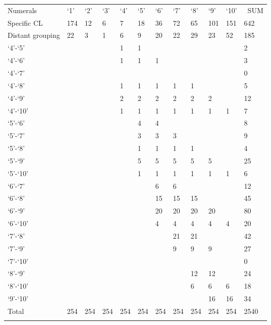 \begin{table}
  
\begin{tabularx}{\textwidth}{lXXXXXXXXXXX}
\lsptoprule
{Numerals} & {‘1’} & {‘2’} & {‘3’} & {‘4’} & {‘5’} & {‘6’} & {‘7’} & {‘8’} & {‘9’} & {‘10’} & {~SUM}\\
Specific CL & 174 & 12 & 6 & 7 & 18 & 36 & 72 & 65 & 101 & 151 & 642\\
Distant grouping & 22 & 3 & 1 & 6 & 9 & 20 & 22 & 29 & 23 & 52 & 185\\
\midrule
‘4’-‘5’ & & ~ & & 1 & 1 & & ~ & & ~ & & 2\\
‘4’-‘6’ & & ~ & & 1 & 1 & 1 & & ~ & & ~ & 3\\
‘4’-‘7’ & & ~ & & ~ & & ~ & & ~ & & ~ & 0\\
‘4’-‘8’ & & ~ & & 1 & 1 & 1 & 1 & 1 & & ~ & 5\\
‘4’-‘9’ & & ~ & & 2 & 2 & 2 & 2 & 2 & 2 & & 12\\
‘4’-‘10’ & & ~ & & 1 & 1 & 1 & 1 & 1 & 1 & 1 & 7\\
‘5’-‘6’ & & ~ & & ~ & 4 & 4 & & ~ & & ~ & 8\\
‘5’-‘7’ & & ~ & & ~ & 3 & 3 & 3 & & ~ & & 9\\
‘5’-‘8’ & & ~ & & ~ & 1 & 1 & 1 & 1 & & ~ & 4\\
‘5’-‘9’ & & ~ & & ~ & 5 & 5 & 5 & 5 & 5 & & 25\\
‘5’-‘10’ & & ~ & & ~ & 1 & 1 & 1 & 1 & 1 & 1 & 6\\
‘6’-‘7’ & & ~ & & ~ & & 6 & 6 & & ~ & & 12\\
‘6’-‘8’ & & ~ & & ~ & & 15 & 15 & 15 & & ~ & 45\\
‘6’-‘9’ & & ~ & & ~ & & 20 & 20 & 20 & 20 & & 80\\
‘6’-‘10’ & & ~ & & ~ & & 4 & 4 & 4 & 4 & 4 & 20\\
‘7’-‘8’ & & ~ & & ~ & & ~ & 21 & 21 & & ~ & 42\\
‘7’-‘9’ & & ~ & & ~ & & ~ & 9 & 9 & 9 & & 27\\
‘7’-‘10’ & & ~ & & ~ & & ~ & & ~ & & ~ & 0\\
‘8’-‘9’ & & ~ & & ~ & & ~ & & 12 & 12 & & 24\\
‘8’-‘10’ & & ~ & & ~ & & ~ & & 6 & 6 & 6 & 18\\
‘9’-‘10’ & & ~ & & ~ & & ~ & & ~ & 16 & 16 & 34\\
\midrule
Total & 254 & 254 & 254 & 254 & 254 & 254 & 254 & 254 & 254 & 254 & 2540\\
\lspbottomrule
\end{tabularx}
\end{table}


